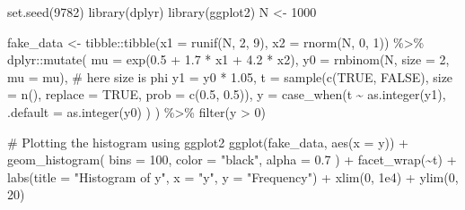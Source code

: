 \documentclass[
  letterpaper,
  DIV=11,
  numbers=noendperiod]{scrreprt}
\newenvironment{Shaded}{\begin{snugshade}}{\end{snugshade}}
\newcommand{\AttributeTok}[1]{\textcolor[rgb]{0.40,0.45,0.13}{#1}}
\newcommand{\CommentTok}[1]{\textcolor[rgb]{0.37,0.37,0.37}{#1}}
\newcommand{\ConstantTok}[1]{\textcolor[rgb]{0.56,0.35,0.01}{#1}}
\newcommand{\DecValTok}[1]{\textcolor[rgb]{0.68,0.00,0.00}{#1}}
\newcommand{\FloatTok}[1]{\textcolor[rgb]{0.68,0.00,0.00}{#1}}
\newcommand{\FunctionTok}[1]{\textcolor[rgb]{0.28,0.35,0.67}{#1}}
\newcommand{\NormalTok}[1]{\textcolor[rgb]{0.00,0.23,0.31}{#1}}
\newcommand{\OtherTok}[1]{\textcolor[rgb]{0.00,0.23,0.31}{#1}}
\newcommand{\SpecialCharTok}[1]{\textcolor[rgb]{0.37,0.37,0.37}{#1}}
\newcommand{\StringTok}[1]{\textcolor[rgb]{0.13,0.47,0.30}{#1}}
\begin{document}
\begin{Shaded}
\begin{Highlighting}[]
\FunctionTok{set.seed}\NormalTok{(}\DecValTok{9782}\NormalTok{)}
\FunctionTok{library}\NormalTok{(dplyr)}
\FunctionTok{library}\NormalTok{(ggplot2)}
\NormalTok{N }\OtherTok{\textless{}{-}} \DecValTok{1000}

\NormalTok{fake\_data }\OtherTok{\textless{}{-}}
\NormalTok{  tibble}\SpecialCharTok{::}\FunctionTok{tibble}\NormalTok{(}\AttributeTok{x1 =} \FunctionTok{runif}\NormalTok{(N, }\DecValTok{2}\NormalTok{, }\DecValTok{9}\NormalTok{), }\AttributeTok{x2 =} \FunctionTok{rnorm}\NormalTok{(N, }\DecValTok{0}\NormalTok{, }\DecValTok{1}\NormalTok{)) }\SpecialCharTok{\%\textgreater{}\%}
\NormalTok{  dplyr}\SpecialCharTok{::}\FunctionTok{mutate}\NormalTok{(}
    \AttributeTok{mu =} \FunctionTok{exp}\NormalTok{(}\FloatTok{0.5} \SpecialCharTok{+} \FloatTok{1.7} \SpecialCharTok{*}\NormalTok{ x1 }\SpecialCharTok{+} \FloatTok{4.2} \SpecialCharTok{*}\NormalTok{ x2),}
    \AttributeTok{y0 =} \FunctionTok{rnbinom}\NormalTok{(N, }\AttributeTok{size =} \DecValTok{2}\NormalTok{, }\AttributeTok{mu =}\NormalTok{ mu), }\CommentTok{\# here size is phi}
    \AttributeTok{y1 =}\NormalTok{ y0 }\SpecialCharTok{*} \FloatTok{1.05}\NormalTok{,}
    \AttributeTok{t =} \FunctionTok{sample}\NormalTok{(}\FunctionTok{c}\NormalTok{(}\ConstantTok{TRUE}\NormalTok{, }\ConstantTok{FALSE}\NormalTok{), }\AttributeTok{size =} \FunctionTok{n}\NormalTok{(), }\AttributeTok{replace =} \ConstantTok{TRUE}\NormalTok{, }\AttributeTok{prob =} \FunctionTok{c}\NormalTok{(}\FloatTok{0.5}\NormalTok{, }\FloatTok{0.5}\NormalTok{)),}
    \AttributeTok{y =} \FunctionTok{case\_when}\NormalTok{(t }\SpecialCharTok{\textasciitilde{}} \FunctionTok{as.integer}\NormalTok{(y1),}
      \AttributeTok{.default =} \FunctionTok{as.integer}\NormalTok{(y0)}
\NormalTok{    )}
\NormalTok{  ) }\SpecialCharTok{\%\textgreater{}\%}
  \FunctionTok{filter}\NormalTok{(y }\SpecialCharTok{\textgreater{}} \DecValTok{0}\NormalTok{)}

\CommentTok{\# Plotting the histogram using ggplot2}
\FunctionTok{ggplot}\NormalTok{(fake\_data, }\FunctionTok{aes}\NormalTok{(}\AttributeTok{x =}\NormalTok{ y)) }\SpecialCharTok{+}
  \FunctionTok{geom\_histogram}\NormalTok{(}
    \AttributeTok{bins =} \DecValTok{100}\NormalTok{,}
    \AttributeTok{color =} \StringTok{"black"}\NormalTok{,}
    \AttributeTok{alpha =} \FloatTok{0.7}
\NormalTok{  ) }\SpecialCharTok{+}
  \FunctionTok{facet\_wrap}\NormalTok{(}\SpecialCharTok{\textasciitilde{}}\NormalTok{t) }\SpecialCharTok{+}
  \FunctionTok{labs}\NormalTok{(}\AttributeTok{title =} \StringTok{"Histogram of y"}\NormalTok{, }\AttributeTok{x =} \StringTok{"y"}\NormalTok{, }\AttributeTok{y =} \StringTok{"Frequency"}\NormalTok{) }\SpecialCharTok{+}
  \FunctionTok{xlim}\NormalTok{(}\DecValTok{0}\NormalTok{, }\FloatTok{1e4}\NormalTok{) }\SpecialCharTok{+}
  \FunctionTok{ylim}\NormalTok{(}\DecValTok{0}\NormalTok{, }\DecValTok{20}\NormalTok{)}
\end{Highlighting}
\end{Shaded}
\end{document}
